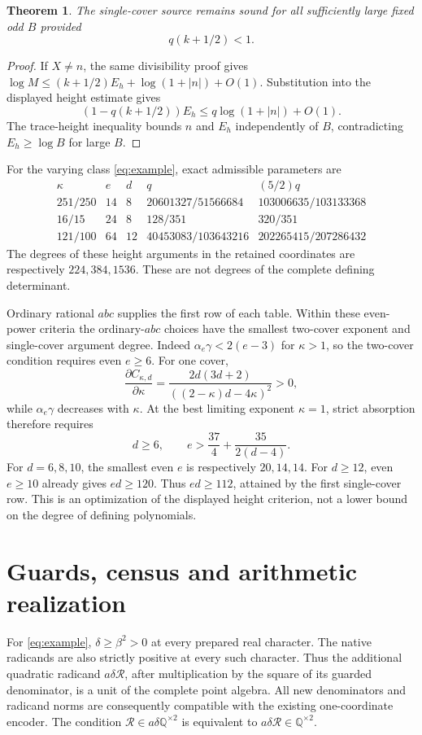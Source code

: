 \documentclass[11pt,a4paper]{article}
\newtheorem{theorem}{Theorem}[section]
\newcommand{\Q}{\mathbb Q}\newcommand{\Z}{\mathbb Z}
\begin{document}
\begin{theorem}\label{thm:single}
The single-cover source remains sound for all sufficiently large
fixed odd $B$ provided
\[
                         q(k+1/2)<1.
\]
\end{theorem}
\begin{proof}
If $X\ne n$, the same divisibility proof gives
$\log M\le(k+1/2)E_h+\log(1+|n|)+O(1)$.
Substitution into the displayed height estimate gives
\[
 (1-q(k+1/2))E_h\le q\log(1+|n|)+O(1).
\]
The trace-height inequality bounds $n$ and $E_h$ independently
of $B$, contradicting $E_h\ge\log B$ for large $B$.
\end{proof}

For the varying class \eqref{eq:example}, exact admissible parameters are
\[
\begin{array}{c|c|c|c|c}
\kappa&e&d&q&(5/2)q\\\hline
251/250&14&8&20601327/51566684&103006635/103133368\\
16/15&24&8&128/351&320/351\\
121/100&64&12&40453083/103643216&202265415/207286432
\end{array}
\]
The degrees of these height arguments in the retained coordinates
are respectively $224,384,1536$. These are not degrees of the
complete defining determinant.

Ordinary rational $abc$ supplies the first row of each table.
Within these even-power criteria the ordinary-$abc$ choices have
the smallest two-cover exponent and single-cover argument degree.
Indeed $\alpha_e\gamma<2(e-3)$ for $\kappa>1$, so the two-cover
condition requires even $e\ge6$. For one cover,
\[
 \frac{\partial C_{\kappa,d}}{\partial\kappa}
 =\frac{2d(3d+2)}{((2-\kappa)d-4\kappa)^2}>0,
\]
while $\alpha_e\gamma$ decreases with $\kappa$. At the best
limiting exponent $\kappa=1$, strict absorption therefore requires
\[
 d\ge6,\qquad e>\frac{37}{4}+\frac{35}{2(d-4)}.
\]
For $d=6,8,10$, the smallest even $e$ is respectively $20,14,14$.
For $d\ge12$, even $e\ge10$ already gives $ed\ge120$.
Thus $ed\ge112$, attained by the first single-cover row.
This is an optimization of the displayed height criterion, not a
lower bound on the degree of defining polynomials.

\section{Guards, census and arithmetic realization}

For \eqref{eq:example}, $\delta\ge\beta^2>0$ at every prepared
real character. The native radicands are also strictly positive
at every such character. Thus the additional quadratic radicand
$a\delta\mathcal R$, after multiplication by the square of its
guarded denominator, is a unit of the complete point algebra.
All new denominators and radicand norms are consequently compatible
with the existing one-coordinate encoder. The condition
$\mathcal R\in a\delta\Q^{\times2}$ is equivalent to
$a\delta\mathcal R\in\Q^{\times2}$.
\end{document}
